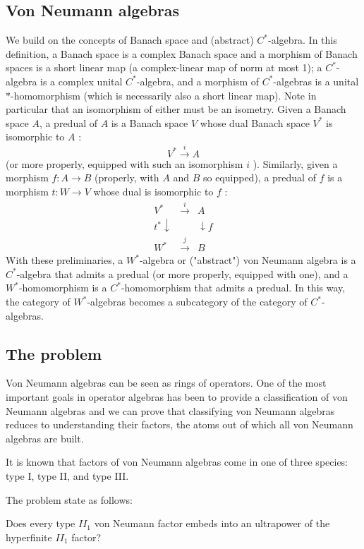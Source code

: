
\subsection{Von Neumann algebras}
We build on the concepts of Banach space and (abstract) $C^{*}$-algebra. In this definition, a Banach space is a complex Banach space and a morphism of Banach spaces is a short linear map (a complex-linear map of norm at most 1); a $C^{*}$-algebra is a complex unital $C^{*}$-algebra, and a morphism of $C^{*}$-algebras is a unital $*$-homomorphism (which is necessarily also a short linear map). Note in particular that an isomorphism of either must be an isometry.
Given a Banach space $A$, a predual of $A$ is a Banach space $V$ whose dual Banach space $V^{*}$ is isomorphic to $A$ :
$$
V^{*} \stackrel{i}{\rightarrow} A
$$
(or more properly, equipped with such an isomorphism $i$ ). Similarly, given a morphism $f: A \rightarrow B$ (properly, with $A$ and $B$ so equipped), a predual of $f$ is a morphism $t: W \rightarrow V$ whose dual is isomorphic to $f$ :
$$
\begin{array}{ccc}
V^{*} & \stackrel{i}{\rightarrow} & A \\
t^{*} \downarrow & & \downarrow f \\
W^{*} & \stackrel{j}\rightarrow & B
\end{array}
$$
With these preliminaries, a $W^{*}$-algebra or ("abstract") von Neumann algebra is a $C^{*}$-algebra that admits a predual (or more properly, equipped with one), and a $W^{*}$-homomorphism is a $C^{*}$-homomorphism that admits a predual. In this way, the category of $W^{*}$-algebras becomes a subcategory of the category of $C^{*}$-algebras.


\subsection{The problem}

Von Neumann algebras can be seen as rings of operators. One of the most important goals in operator algebras has been to provide a classification of von Neumann algebras and we can prove that classifying von Neumann algebras reduces to understanding their factors, the atoms out of which all von Neumann algebras are built.

It is known that factors of von Neumann algebras come in one of three species: type I, type II, and type III. 

The problem state as follows:

\begin{problem}
    Does every type $II_1$ von Neumann factor embeds into an ultrapower of the hyperfinite $II_1$ factor?
\end{problem}

